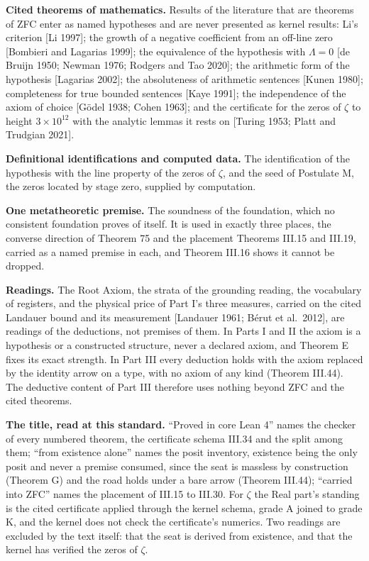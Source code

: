\documentclass[10pt,twocolumn]{article}
\begin{document}
\textbf{Cited theorems of mathematics.} Results of the literature that
are theorems of ZFC enter as named hypotheses and are never presented as
kernel results: Li's criterion {[}Li 1997{]}; the growth of a negative
coefficient from an off-line zero {[}Bombieri and Lagarias 1999{]}; the
equivalence of the hypothesis with \(\Lambda = 0\) {[}de Bruijn 1950;
Newman 1976; Rodgers and Tao 2020{]}; the arithmetic form of the
hypothesis {[}Lagarias 2002{]}; the absoluteness of arithmetic sentences
{[}Kunen 1980{]}; completeness for true bounded sentences {[}Kaye
1991{]}; the independence of the axiom of choice {[}Gödel 1938; Cohen
1963{]}; and the certificate for the zeros of \(\zeta\) to height
\(3 \times 10^{12}\) with the analytic lemmas it rests on {[}Turing
1953; Platt and Trudgian 2021{]}.

\textbf{Definitional identifications and computed data.} The
identification of the hypothesis with the line property of the zeros of
\(\zeta\), and the seed of Postulate M, the zeros located by stage zero,
supplied by computation.

\textbf{One metatheoretic premise.} The soundness of the foundation,
which no consistent foundation proves of itself. It is used in exactly
three places, the converse direction of Theorem 75 and the placement
Theorems III.15 and III.19, carried as a named premise in each, and
Theorem III.16 shows it cannot be dropped.

\textbf{Readings.} The Root Axiom, the strata of the grounding reading,
the vocabulary of registers, and the physical price of Part I's three
measures, carried on the cited Landauer bound and its measurement
{[}Landauer 1961; Bérut et al.~2012{]}, are readings of the deductions,
not premises of them. In Parts I and II the axiom is a hypothesis or a
constructed structure, never a declared axiom, and Theorem E fixes its
exact strength. In Part III every deduction holds with the axiom
replaced by the identity arrow on a type, with no axiom of any kind
(Theorem III.44). The deductive content of Part III therefore uses
nothing beyond ZFC and the cited theorems.

\textbf{The title, read at this standard.} ``Proved in core Lean 4''
names the checker of every numbered theorem, the certificate schema
III.34 and the split among them; ``from existence alone'' names the
posit inventory, existence being the only posit and never a premise
consumed, since the seat is massless by construction (Theorem G) and the
road holds under a bare arrow (Theorem III.44); ``carried into ZFC''
names the placement of III.15 to III.30. For \(\zeta\) the Real part's
standing is the cited certificate applied through the kernel schema,
grade A joined to grade K, and the kernel does not check the
certificate's numerics. Two readings are excluded by the text itself:
that the seat is derived from existence, and that the kernel has
verified the zeros of \(\zeta\).
\end{document}
